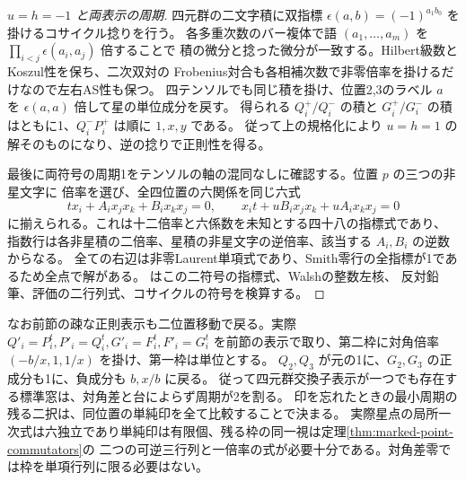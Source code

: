 \begin{proof}[$u=h=-1$ と両表示の周期]
四元群の二文字積に双指標 $\epsilon(a,b)=(-1)^{a_1 b_0}$ を掛けるコサイクル捻りを行う。
各多重次数のバー複体で語 $(a_1,\ldots,a_m)$ を $\prod_{i<j}\epsilon(a_i,a_j)$ 倍することで
積の微分と捻った微分が一致する。Hilbert級数とKoszul性を保ち、二次双対の
Frobenius対合も各相補次数で非零倍率を掛けるだけなので左右AS性も保つ。
四テンソルでも同じ積を掛け、位置2,3のラベル $a$ を $\epsilon(a,a)$ 倍して星の単位成分を戻す。
得られる $Q_i^+/Q_i^-$ の積と $G_i^+/G_i^-$ の積はともに1、$Q_i^-P_i^+$ は順に $1,x,y$ である。
従って上の規格化により $u=h=1$ の解そのものになり、逆の捻りで正則性を得る。

最後に両符号の周期1をテンソルの軸の混同なしに確認する。位置 $p$ の三つの非星文字に
倍率を選び、全四位置の六関係を同じ六式
\[
       t x_i+A_i x_jx_k+B_i x_kx_j=0,\qquad
       x_i t+u B_i x_jx_k+u A_i x_kx_j=0
\]
に揃えられる。これは十二倍率と六係数を未知とする四十八の指標式であり、
指数行は各非星積の二倍率、星積の非星文字の逆倍率、該当する $A_i,B_i$ の逆数からなる。
全ての右辺は非零Laurent単項式であり、Smith零行の全指標が1であるため全点で解がある。
 はこの二符号の指標式、Walshの整数左核、
反対鉛筆、評価の二行列式、コサイクルの符号を検算する。
\end{proof}

なお前節の疎な正則表示も二位置移動で戻る。実際 $Q'_i=P_i^t,P'_i=Q_i^t,G'_i=F_i^t,F'_i=G_i^t$
を前節の表示で取り、第二枠に対角倍率 $(-b/x,1,1/x)$ を掛け、第一枠は単位とする。
$Q_2,Q_3$ が元の1に、$G_2,G_3$ の正成分も1に、負成分も $b,x/b$ に戻る。
従って四元群交換子表示が一つでも存在する標準窓は、対角差と台によらず周期が2を割る。
印を忘れたときの最小周期の残る二択は、同位置の単純印を全て比較することで決まる。
実際星点の局所一次式は六独立であり単純印は有限個、残る枠の同一視は定理\ref{thm:marked-point-commutators}の
二つの可逆三行列と一倍率の式が必要十分である。対角差零では枠を単項行列に限る必要はない。
